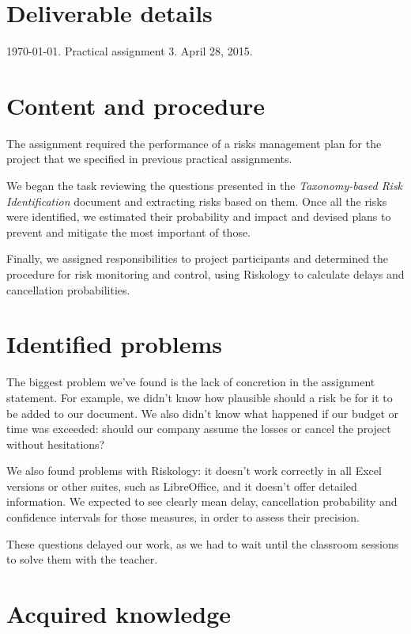 \section{Deliverable details}

\noindent
{} \today.
 Practical assignment 3.
 April 28, 2015.

\section{Content and procedure}

The assignment required the performance of a risks management plan for the project that we specified in previous practical assignments.

We began the task reviewing the questions presented in the \textit{Taxonomy-based Risk Identification} document and extracting risks based on them. Once all the risks were identified, we estimated their probability and impact and devised plans to prevent and mitigate the most important of those.

Finally, we assigned responsibilities to project participants and determined the procedure for risk monitoring and control, using Riskology to calculate delays and cancellation probabilities.

\section{Identified problems}

The biggest problem we've found is the lack of concretion in the assignment statement. For example, we didn't know how plausible should a risk be for it to be added to our document. We also didn't know what happened if our budget or time was exceeded: should our company assume the losses or cancel the project without hesitations?

We also found problems with Riskology: it doesn't work correctly in all Excel versions or other suites, such as LibreOffice, and it doesn't offer detailed information. We expected to see clearly mean delay, cancellation probability and confidence intervals for those measures, in order to assess their precision.

These questions delayed our work, as we had to wait until the classroom sessions to solve them with the teacher.

\section{Acquired knowledge}

